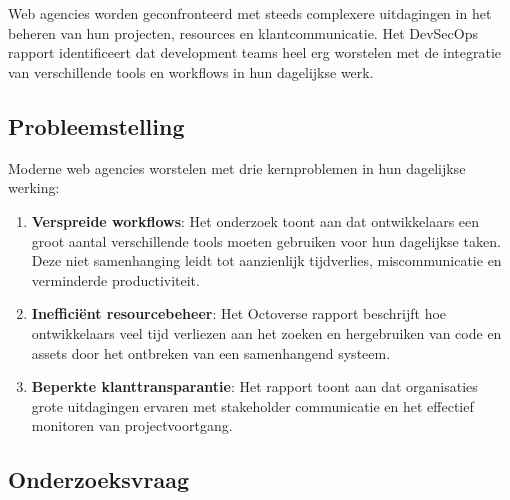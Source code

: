
\chapter{}
\label{ch:inleiding}

Web agencies worden geconfronteerd met steeds complexere uitdagingen in het beheren van hun projecten, resources en klantcommunicatie. Het \textcite{GitLab2023} DevSecOps rapport identificeert dat development teams heel erg worstelen met de integratie van verschillende tools en workflows in hun dagelijkse werk.

\section{Probleemstelling}
\label{sec:probleemstelling}

Moderne web agencies worstelen met drie kernproblemen in hun dagelijkse werking:

\begin{enumerate}
    \item \textbf{Verspreide workflows}: Het \textcite{StackOverflow2023} onderzoek toont aan dat ontwikkelaars een groot aantal verschillende tools moeten gebruiken voor hun dagelijkse taken. Deze niet samenhanging leidt tot aanzienlijk tijdverlies, miscommunicatie en verminderde productiviteit.
    
    \item \textbf{Inefficiënt resourcebeheer}: Het \textcite{GitHub2023} Octoverse rapport beschrijft hoe ontwikkelaars veel tijd verliezen aan het zoeken en hergebruiken van code en assets door het ontbreken van een samenhangend systeem.
    
    \item \textbf{Beperkte klanttransparantie}: Het \textcite{StateOfAgile2023} rapport toont aan dat organisaties grote uitdagingen ervaren met stakeholder communicatie en het effectief monitoren van projectvoortgang.
\end{enumerate}

\section{Onderzoeksvraag}
\label{sec:onderzoeksvraag}

